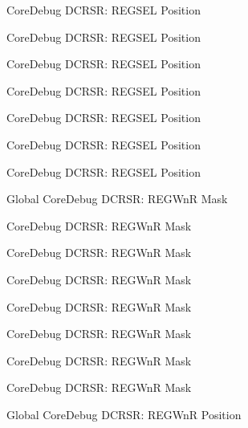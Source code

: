 \begin{DoxyRefList}
\label{deprecated__deprecated000405}%
%
Core\+Debug DCRSR\+: REGSEL Position 

\label{deprecated__deprecated000131}%
%
Core\+Debug DCRSR\+: REGSEL Position 

\label{deprecated__deprecated000596}%
%
Core\+Debug DCRSR\+: REGSEL Position 

\label{deprecated__deprecated000329}%
%
Core\+Debug DCRSR\+: REGSEL Position 

\label{deprecated__deprecated000270}%
%
Core\+Debug DCRSR\+: REGSEL Position 

\label{deprecated__deprecated000043}%
%
Core\+Debug DCRSR\+: REGSEL Position 

\label{deprecated__deprecated000187}%
%
Core\+Debug DCRSR\+: REGSEL Position  
\item[Global \doxylink{group___c_m_s_i_s___core_debug_ga1eef4992d8f84bc6c0dffed1c87f90a5}{Core\+Debug\+\_\+\+DCRSR\+\_\+\+REGWn\+R\+\_\+\+Msk} ]\label{deprecated__deprecated000404}%
%
Core\+Debug DCRSR\+: REGWnR Mask 

\label{deprecated__deprecated000042}%
%
Core\+Debug DCRSR\+: REGWnR Mask 

\label{deprecated__deprecated000130}%
%
Core\+Debug DCRSR\+: REGWnR Mask 

\label{deprecated__deprecated000328}%
%
Core\+Debug DCRSR\+: REGWnR Mask 

\label{deprecated__deprecated000595}%
%
Core\+Debug DCRSR\+: REGWnR Mask 

\label{deprecated__deprecated000269}%
%
Core\+Debug DCRSR\+: REGWnR Mask 

\label{deprecated__deprecated000186}%
%
Core\+Debug DCRSR\+: REGWnR Mask 

\label{deprecated__deprecated000493}%
%
Core\+Debug DCRSR\+: REGWnR Mask  
\item[Global \doxylink{group___c_m_s_i_s___core_debug_ga51e75942fc0614bc9bb2c0e96fcdda9a}{Core\+Debug\+\_\+\+DCRSR\+\_\+\+REGWn\+R\+\_\+\+Pos} ]\label{deprecated__deprecated000185}%
%
Core\+Debug DCRSR\+: REGWnR Position 


\end{DoxyRefList}
